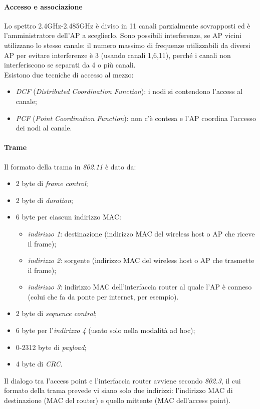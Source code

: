 \paragraph{Accesso e associazione}
Lo spettro 2.4GHz-2.485GHz è diviso in 11 canali parzialmente sovrapposti ed è l'amministratore dell'AP a sceglierlo. Sono possibili interferenze, se AP vicini utilizzano lo stesso canale: il numero massimo di frequenze utilizzabili da diversi AP per evitare interferenze è 3 (usando canali 1,6,11), perché i canali non interferiscono se separati da 4 o più canali. \\
Esistono due tecniche di accesso al mezzo:
\begin{itemize}
	\item \textit{DCF} (\textit{Distributed Coordination Function}): i nodi si contendono l'access al canale;
	\item \textit{\textit{PCF}} (\textit{Point Coordination Function}): non c'è contesa e l'AP coordina l'accesso dei nodi al canale.
\end{itemize}

\paragraph{Trame}
Il formato della trama in \textit{802.11} è dato da:
\begin{itemize}
	\item 2 byte di \textit{frame control};
	\item 2 byte di \textit{duration};
	\item 6 byte per ciascun indirizzo MAC:
	\begin{itemize}
		\item \textit{indirizzo 1}: destinazione (indirizzo MAC del wireless host o AP che riceve il frame);
		\item \textit{indirizzo 2}: sorgente (indirizzo MAC del wireless host o AP che trasmette il frame);
		\item \textit{indirizzo 3}: indirizzo MAC dell'interfaccia router al quale l'AP è conneso (colui che fa da ponte per internet, per esempio).
	\end{itemize}
	\item 2 byte di \textit{sequence control};
	\item 6 byte per l'\textit{indirizzo 4} (usato solo nella modalità ad hoc);
	\item 0-2312 byte di \textit{payload};
	\item 4 byte di \textit{CRC}.
\end{itemize}
Il dialogo tra l'access point e l'interfaccia router avviene secondo \textit{802.3}, il cui formato della trama prevede vi siano solo due indirizzi: l'indirizzo MAC di destinazione (MAC del router) e quello mittente (MAC dell'access point).

